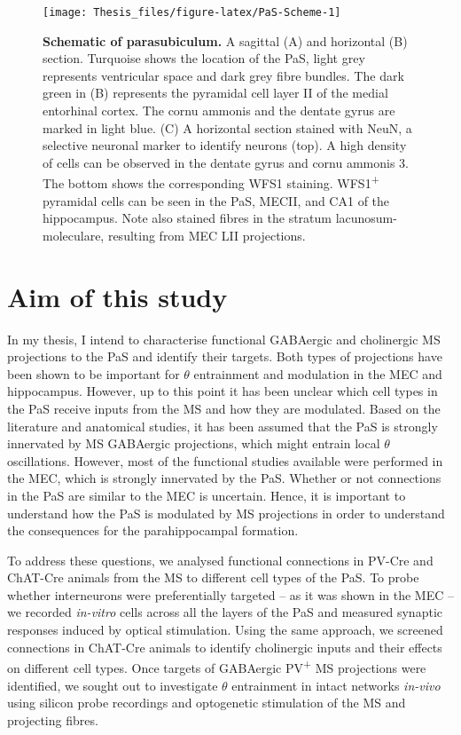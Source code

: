 \documentclass[
  12pt,
  a4paper,
  openany]{book}
\begin{document}
\begin{figure}[htbp]
\texttt{[image: Thesis\_files/figure-latex/PaS-Scheme-1]} \caption[Schematic of parasubiculum]{\textbf{Schematic of parasubiculum.} A sagittal (A) and horizontal (B) section. Turquoise shows the location of the PaS, light grey represents ventricular space and dark grey fibre bundles. The dark green in (B) represents the pyramidal cell layer II of the medial entorhinal cortex. The cornu ammonis and the dentate gyrus are marked in light blue. (C) A horizontal section stained with NeuN, a selective neuronal marker to identify neurons (top). A high density of cells can be observed in the dentate gyrus and cornu ammonis 3. The bottom shows the corresponding WFS1 staining. WFS1\textsuperscript{+} pyramidal cells can be seen in the PaS, MECII, and CA1 of the hippocampus. Note also stained fibres in the stratum lacunosum-moleculare, resulting from MEC LII projections.}\label{fig:PaS-Scheme}
\end{figure}

\hypertarget{aim-of-this-study}{%
\section{Aim of this study}\label{aim-of-this-study}}

In my thesis, I intend to characterise functional GABAergic and cholinergic MS projections to the PaS and identify their targets. Both types of projections have been shown to be important for \(\theta\) entrainment and modulation in the MEC and hippocampus. However, up to this point it has been unclear which cell types in the PaS receive inputs from the MS and how they are modulated. Based on the literature and anatomical studies, it has been assumed that the PaS is strongly innervated by MS GABAergic projections, which might entrain local \(\theta\) oscillations. However, most of the functional studies available were performed in the MEC, which is strongly innervated by the PaS. Whether or not connections in the PaS are similar to the MEC is uncertain. Hence, it is important to understand how the PaS is modulated by MS projections in order to understand the consequences for the parahippocampal formation.

To address these questions, we analysed functional connections in PV-Cre and ChAT-Cre animals from the MS to different cell types of the PaS. To probe whether interneurons were preferentially targeted -- as it was shown in the MEC -- we recorded \emph{in-vitro} cells across all the layers of the PaS and measured synaptic responses induced by optical stimulation. Using the same approach, we screened connections in ChAT-Cre animals to identify cholinergic inputs and their effects on different cell types. Once targets of GABAergic PV\textsuperscript{+} MS projections were identified, we sought out to investigate \(\theta\) entrainment in intact networks \emph{in-vivo} using silicon probe recordings and optogenetic stimulation of the MS and projecting fibres.
\end{document}
